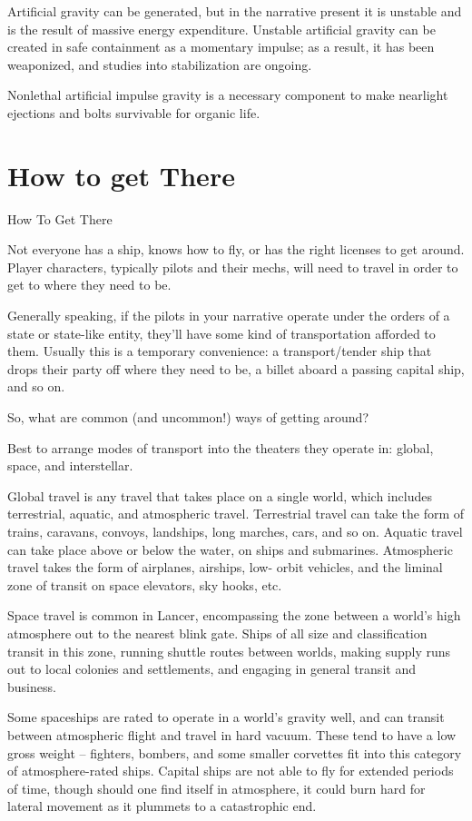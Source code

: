 Artificial gravity can be generated, but in the narrative present it is unstable and is the result of
massive energy expenditure. Unstable artificial gravity can be created in safe containment as a
momentary impulse; as a result, it has been weaponized, and studies into stabilization are
ongoing.


Nonlethal artificial impulse gravity is a necessary component to make nearlight ejections and
bolts survivable for organic life.
\section{How to get There}
How To Get There

Not everyone has a ship, knows how to fly, or has the right licenses to get around. Player
characters, typically pilots and their mechs, will need to travel in order to get to where they need
to be.


Generally speaking, if the pilots in your narrative operate under the orders of a state or state-like
entity, they’ll have some kind of transportation afforded to them. Usually this is a temporary
convenience: a transport/tender ship that drops their party off where they need to be, a billet
aboard a passing capital ship, and so on.


So, what are common (and uncommon!) ways of getting around?


Best to arrange modes of transport into the theaters they operate in: global, space, and
interstellar.


Global travel is any travel that takes place on a single world, which includes terrestrial, aquatic,
and atmospheric travel. Terrestrial travel can take the form of trains, caravans, convoys,
landships, long marches, cars, and so on. Aquatic travel can take place above or below the
water, on ships and submarines. Atmospheric travel takes the form of airplanes, airships, low-
orbit vehicles, and the liminal zone of transit on space elevators, sky hooks, etc.


Space travel is common in Lancer, encompassing the zone between a world’s high atmosphere
out to the nearest blink gate. Ships of all size and classification transit in this zone, running
shuttle routes between worlds, making supply runs out to local colonies and settlements, and
engaging in general transit and business.


Some spaceships are rated to operate in a world’s gravity well, and can transit between
atmospheric flight and travel in hard vacuum. These tend to have a low gross weight --  fighters,
bombers, and some smaller corvettes fit into this category of atmosphere-rated ships. Capital
ships are not able to fly for extended periods of time, though should one find itself in
atmosphere, it could burn hard for lateral movement as it plummets to a catastrophic end.





